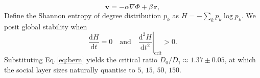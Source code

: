 \begin{equation}
\mathbf{v} = -\alpha \nabla \Phi + \beta\,\mathbf{r},
\label{eq:vfield}
\end{equation}
Define the Shannon entropy of degree distribution $p_{k}$ as
$H = -\sum_{k} p_{k}\log p_{k}$.
We posit global stability when
\begin{equation}
\frac{\mathrm{d}H}{\mathrm{d}t}=0
\quad\text{and}\quad
\left.\frac{\mathrm{d}^{2}H}{\mathrm{d}t^{2}}\right|_{\mathrm{crit}}>0 .
\end{equation}
Substituting Eq.\,\eqref{eq:bern} yields the critical ratio
$D_{0}/D_{1} \approx 1.37 \pm 0.05$,
at which the social layer sizes naturally quantise to
$5,\,15,\,50,\,150$.
